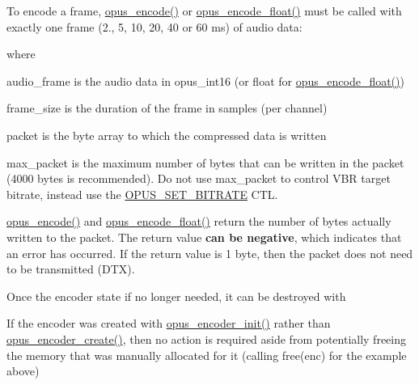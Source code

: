 To encode a frame, \mbox{\hyperlink{group__opus__encoder_gabbb51305050b64614329637d6eff777c}{opus\+\_\+encode()}} or \mbox{\hyperlink{group__opus__encoder_ga4d7243152a1bc6bf4953d1d5c1e530c6}{opus\+\_\+encode\+\_\+float()}} must be called with exactly one frame (2., 5, 10, 20, 40 or 60 ms) of audio data\+: 
\begin{DoxyCode}{0}
\end{DoxyCode}


where 
\begin{DoxyItemize}
\item audio\+\_\+frame is the audio data in opus\+\_\+int16 (or float for \mbox{\hyperlink{group__opus__encoder_ga4d7243152a1bc6bf4953d1d5c1e530c6}{opus\+\_\+encode\+\_\+float()}}) 
\item frame\+\_\+size is the duration of the frame in samples (per channel) 
\item packet is the byte array to which the compressed data is written 
\item max\+\_\+packet is the maximum number of bytes that can be written in the packet (4000 bytes is recommended). Do not use max\+\_\+packet to control V\+BR target bitrate, instead use the \mbox{\hyperlink{group__opus__encoderctls_ga0bb51947e355b33d0cb358463b5101a7}{O\+P\+U\+S\+\_\+\+S\+E\+T\+\_\+\+B\+I\+T\+R\+A\+TE}} C\+TL. 
\end{DoxyItemize}

\mbox{\hyperlink{group__opus__encoder_gabbb51305050b64614329637d6eff777c}{opus\+\_\+encode()}} and \mbox{\hyperlink{group__opus__encoder_ga4d7243152a1bc6bf4953d1d5c1e530c6}{opus\+\_\+encode\+\_\+float()}} return the number of bytes actually written to the packet. The return value {\bfseries{can be negative}}, which indicates that an error has occurred. If the return value is 1 byte, then the packet does not need to be transmitted (D\+TX).

Once the encoder state if no longer needed, it can be destroyed with


\begin{DoxyCode}{0}
\end{DoxyCode}


If the encoder was created with \mbox{\hyperlink{group__opus__encoder_ga363e90db0f434b2d8fde7dcf989270b1}{opus\+\_\+encoder\+\_\+init()}} rather than \mbox{\hyperlink{group__opus__encoder_ga8a145618886fed2d6fbc79a4071a939d}{opus\+\_\+encoder\+\_\+create()}}, then no action is required aside from potentially freeing the memory that was manually allocated for it (calling free(enc) for the example above) 

